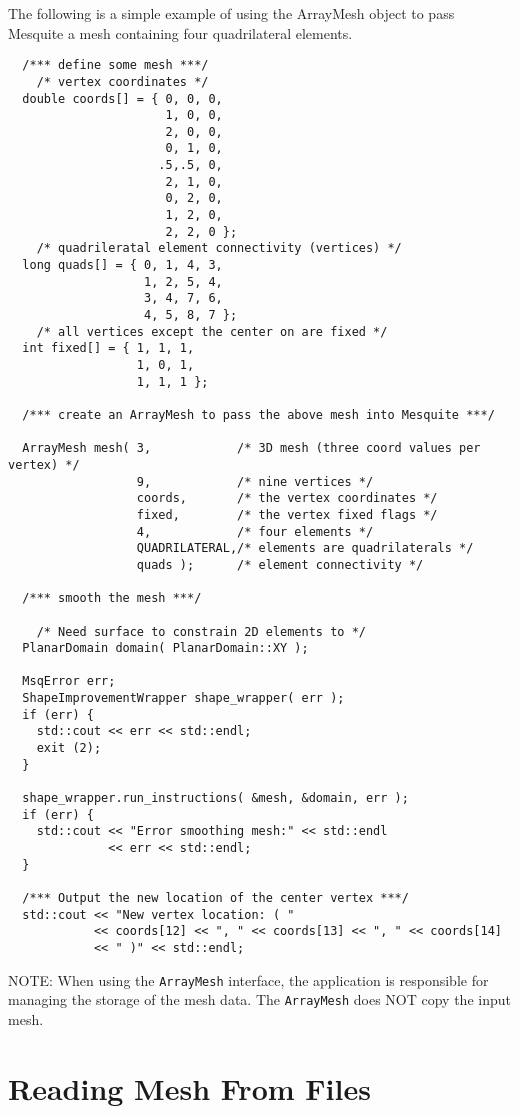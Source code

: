 The following is a simple example of using the ArrayMesh object to pass
Mesquite a mesh containing four quadrilateral elements.
\begin{verbatim}
  /*** define some mesh ***/
    /* vertex coordinates */
  double coords[] = { 0, 0, 0,
                      1, 0, 0,
                      2, 0, 0,
                      0, 1, 0,
                     .5,.5, 0,
                      2, 1, 0,
                      0, 2, 0,
                      1, 2, 0,
                      2, 2, 0 };
    /* quadrileratal element connectivity (vertices) */
  long quads[] = { 0, 1, 4, 3,
                   1, 2, 5, 4,
                   3, 4, 7, 6,
                   4, 5, 8, 7 };
    /* all vertices except the center on are fixed */
  int fixed[] = { 1, 1, 1,
                  1, 0, 1,
                  1, 1, 1 };
  
  /*** create an ArrayMesh to pass the above mesh into Mesquite ***/
  
  ArrayMesh mesh( 3,            /* 3D mesh (three coord values per vertex) */
                  9,            /* nine vertices */
                  coords,       /* the vertex coordinates */ 
                  fixed,        /* the vertex fixed flags */
                  4,            /* four elements */
                  QUADRILATERAL,/* elements are quadrilaterals */
                  quads );      /* element connectivity */
  
  /*** smooth the mesh ***/
  
    /* Need surface to constrain 2D elements to */
  PlanarDomain domain( PlanarDomain::XY );

  MsqError err;
  ShapeImprovementWrapper shape_wrapper( err );
  if (err) {
    std::cout << err << std::endl;
    exit (2);
  }
  
  shape_wrapper.run_instructions( &mesh, &domain, err );
  if (err) {
    std::cout << "Error smoothing mesh:" << std::endl
              << err << std::endl;
  }
  
  /*** Output the new location of the center vertex ***/
  std::cout << "New vertex location: ( "
            << coords[12] << ", " << coords[13] << ", " << coords[14]
            << " )" << std::endl;
\end{verbatim}

NOTE:  When using the \texttt{ArrayMesh} interface, the application is responsible for managing the storage of the mesh data.  The \texttt{ArrayMesh}
 does NOT copy the input mesh.  

 
\section{Reading Mesh From Files} \label{sec:meshFiles}

